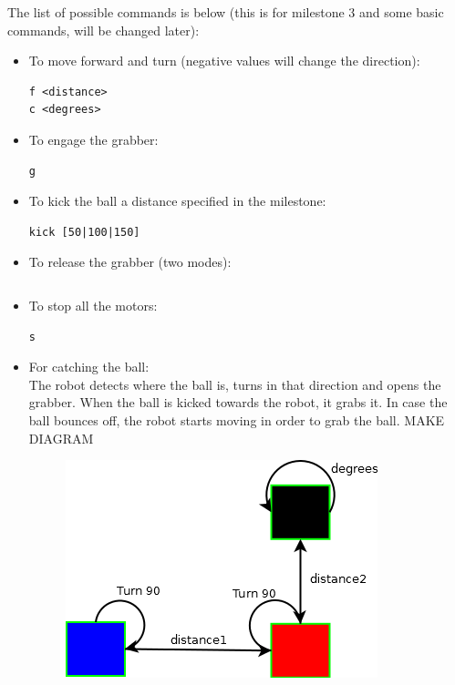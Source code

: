 \documentclass[12pt]{article}
\begin{document}
The list of possible commands is below (this is for milestone 3 and some basic commands, will be changed later):
\bigskip
\begin{itemize}

\item To move forward and turn (negative values will change the direction):
\begin{lstlisting}
f <distance>
c <degrees>
\end{lstlisting}

\item To engage the grabber:
\begin{lstlisting}
g
\end{lstlisting}

\item To kick the ball a distance specified in the milestone:
\begin{lstlisting}
kick [50|100|150]
\end{lstlisting}

\item To release the grabber (two modes):
\begin{lstlisting}

\end{lstlisting}

\item To stop all the motors:
\begin{lstlisting}
s
\end{lstlisting}

\item For catching the ball:
\\The robot detects where the ball is, turns in that direction and opens the grabber. When the ball is kicked towards the robot, it grabs it. In case the ball bounces off, the robot starts moving in order to grab the ball.
\bigskip
MAKE DIAGRAM
\begin{figure}
    \centering
    \includegraphics{Diagram1}
\end{figure}


\end{itemize}
\end{document}
